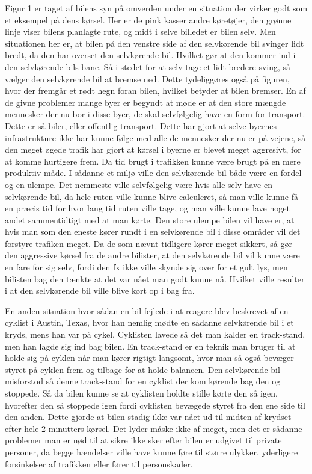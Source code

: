 Figur 1 er taget af bilens syn på omverden under  en situation der virker godt som  et eksempel på dens kørsel. Her er de pink kasser andre køretøjer, den grønne linje viser bilens planlagte rute, og midt i selve billedet er bilen selv. Men situationen her er, at bilen på den venstre side af den selvkørende bil svinger lidt bredt, da den har overset den selvkørende bil. Hvilket gør at den kommer ind i den selvkørende bils bane. Så i stedet for at selv tage et lidt bredere sving, så vælger den selvkørende bil at bremse ned. Dette tydeliggøres også på figuren, hvor der fremgår et rødt hegn foran bilen, hvilket  betyder at bilen bremser\cite{Backchannel}. En af de givne problemer mange byer er begyndt at møde er at den store mængde mennesker der nu bor i disse byer, de skal selvfølgelig have en form for transport. Dette er så biler, eller offentlig transport. Dette har gjort at selve byernes infrastrukture ikke har kunne følge med alle de mennesker der nu er på vejene, så den meget øgede trafik har gjort at  kørsel i byerne er blevet meget aggresivt, for at komme hurtigere frem. Da tid brugt i trafikken kunne være brugt på en mere produktiv måde\cite{Michelin}. I sådanne et miljø ville den selvkørende bil både være en fordel og en ulempe. Det nemmeste ville selvfølgelig være hvis alle selv have en selvkørende bil, da hele ruten ville kunne blive calculeret, så man ville kunne få en præcis tid for hvor lang tid ruten ville tage, og man ville kunne lave noget andet sammentidtigt med at man kørte. Den store ulempe bilen vil have er, at hvis man som den eneste kører rundt i en selvkørende bil i disse områder vil det forstyre trafiken meget. Da de som nævnt tidligere kører meget sikkert, så gør den aggressive kørsel fra de andre bilister, at den selvkørende bil vil kunne være en fare for sig selv, fordi den fx ikke ville skynde sig over for et gult lys, men bilisten bag den tænkte at det var nået man godt kunne nå. Hvilket ville resulter i at den selvkørende bil ville blive kørt op i bag fra.

En anden situation hvor sådan en bil fejlede i at reagere blev beskrevet af en cyklist i Austin, Texas, hvor han nemlig mødte en sådanne selvkørende bil i et kryds, mens han var på cykel. Cyklisten lavede så det man kalder en track-stand, men han lagde sig ind bag bilen. En track-stand er en teknik man bruger til at holde sig på cyklen når man kører rigtigt langsomt, hvor man så også bevæger styret på cyklen frem og tilbage for at holde balancen. Den selvkørende bil misforstod så denne track-stand for en cyklist der kom kørende bag den og stoppede. Så da bilen kunne se at cyklisten holdte stille kørte den så igen, hvorefter den så stoppede igen fordi cyklisten bevægede styret fra den ene side til den anden. Dette gjorde at bilen stadig ikke var nået ud til midten af krydset efter hele 2 minutters kørsel\cite{VOX}. Det lyder måske ikke af meget, men det er sådanne problemer man er nød til at sikre ikke sker efter bilen er udgivet til private personer, da begge hændelser ville have kunne føre til større ulykker, yderligere forsinkelser af trafikken eller fører til personskader. 